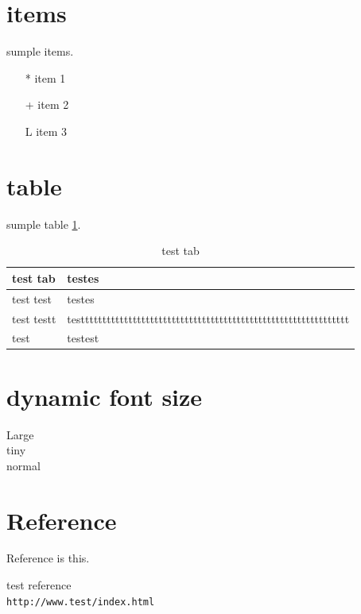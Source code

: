 \documentclass[10pt]{jsarticle}
\begin{document}
\newpage

\section{items}
sumple items.
\begin{itemize}
 \item[*] item 1
 \item[+] item 2
 \item[L] item 3
\end{itemize}

\section{table}
sumple table \ref{tab:one}.
\begin{table}[htb]
 \begin{center}
  \caption{test tab}
  \label{tab:one}
  \begin{tabular}[htb]{|p{4cm}|p{10cm}|} \hline
test tab & testes \\ \hline \hline
test test & testes \\ \hline
test testt & testttttttttttttttttttttttttttttttttttttttttttttttttttttttttttttt\\ \hline
test & testest\\ \hline
  \end{tabular}
 \end{center}
\end{table}

\section{dynamic font size}
\noindent \Large Large\\
\tiny tiny\\
\normalsize normal\\

\section{Reference}
Reference is this\cite{test}.

\begin{thebibliography}{99}
test reference\\
\verb|http://www.test/index.html|
\end{thebibliography}
\end{document}
